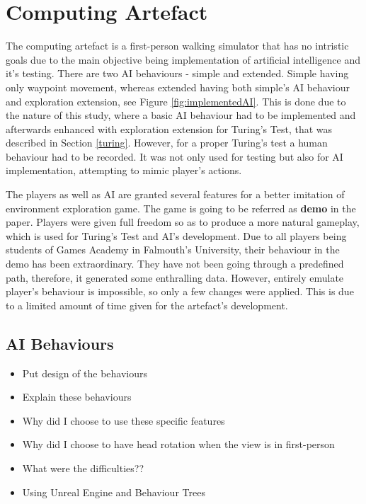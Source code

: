 \documentclass[journal]{IEEEtran}
\begin{document}


\section{Computing Artefact}
The computing artefact is a first-person walking simulator that has no intristic goals due to the main objective being implementation of artificial intelligence and it's testing. There are two AI behaviours - simple and extended. Simple having only waypoint movement, whereas extended having both simple's AI behaviour and exploration extension, see Figure \ref{fig:implementedAI}. This is done due to the nature of this study, where a basic AI behaviour had to be implemented and afterwards enhanced with exploration extension for Turing's Test, that was described in Section \ref{turing}. However, for a proper Turing's test a human behaviour had to be recorded. It was not only used for testing but also for AI implementation, attempting to mimic player's actions.

The players as well as AI are granted several features for a better imitation of environment exploration game. The game is going to be referred as \textbf{demo} in the paper. Players were given full freedom so as to produce a more natural gameplay, which is used for Turing's Test and AI's development. Due to all players being students of Games Academy in Falmouth's University, their behaviour in the demo has been extraordinary. They have not been going through a predefined path, therefore, it generated some enthralling data. However, entirely emulate player's behaviour is impossible, so only a few changes were applied. This is due to a limited amount of time given for the artefact's development. 

\subsection{AI Behaviours}
\begin{itemize}
	\item Put design of the behaviours
	\item Explain these behaviours
	\item Why did I choose to use these specific features
	\item Why did I choose to have head rotation when the view is in first-person
	\item What were the difficulties??
	\item Using Unreal Engine and Behaviour Trees
\end{itemize}
\end{document}
